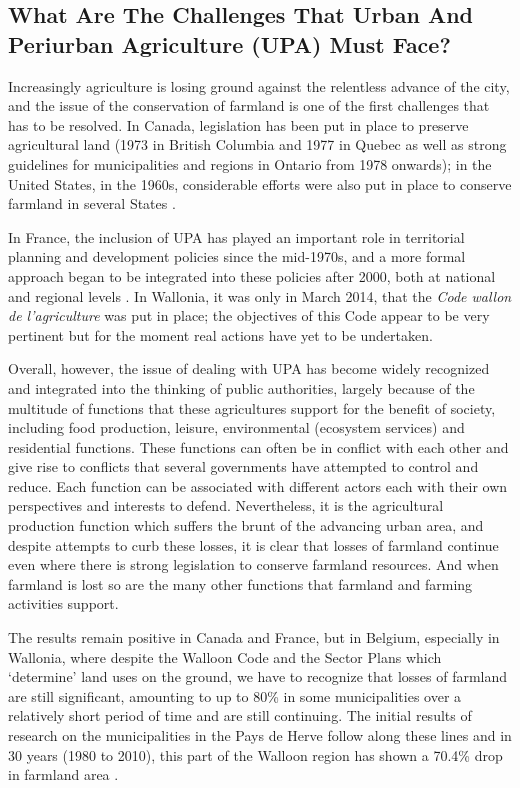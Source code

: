\documentclass[10pt,a4paper]{article}
\begin{document}
\begin{multicols}{2}
\section{What Are The Challenges That Urban And Periurban Agriculture (UPA) Must Face?}
\noindent Increasingly agriculture is losing ground against the relentless advance of the city, and the issue of the conservation of farmland is one of the first challenges that has to be resolved. In Canada, legislation has been put in place to preserve agricultural land (1973 in British Columbia and 1977 in Quebec as well as strong guidelines for municipalities and regions in Ontario from 1978 onwards); in the United States, in the 1960s, considerable efforts were also put in place to conserve farmland in several States \citep{r08, r09}.

In France, the inclusion of UPA has played an important role in territorial planning and development policies since the mid-1970s, and a more formal approach began to be integrated into these policies after 2000, both at national and regional levels \citep{r10}. In Wallonia, it was only in March 2014, that the \textit{Code wallon de l'agriculture} was put in place; the objectives of this Code appear to be very pertinent but for the moment real actions have yet to be undertaken.

Overall, however, the issue of dealing with UPA has become widely recognized and integrated into the thinking of public authorities, largely because of the multitude of functions that these agricultures support for the benefit of society, including food production, leisure, environmental (ecosystem services) and residential functions. These functions can often be in conflict with each other and give rise to conflicts that several governments have attempted to control and reduce. Each function can be associated with different actors each with their own perspectives and interests to defend. Nevertheless, it is the agricultural production function which suffers the brunt of the advancing urban area, and despite attempts to curb these losses, it is clear that losses of farmland continue even where there is strong legislation to conserve farmland resources. And when farmland is lost so are the many other functions that farmland and farming activities support.

The results remain positive in Canada and France, but in Belgium, especially in Wallonia, where despite the Walloon Code and the Sector Plans which `determine' land uses on the ground, we have to recognize that losses of farmland are still significant, amounting to up to 80\% in some municipalities over a relatively short period of time \citep{r11} and are still continuing. The initial results of research on the municipalities in the Pays de Herve follow along these lines and in 30 years (1980 to 2010), this part of the Walloon region has shown a 70.4\% drop in farmland area \citep{r12, r13}.


\end{multicols}
\end{document}
